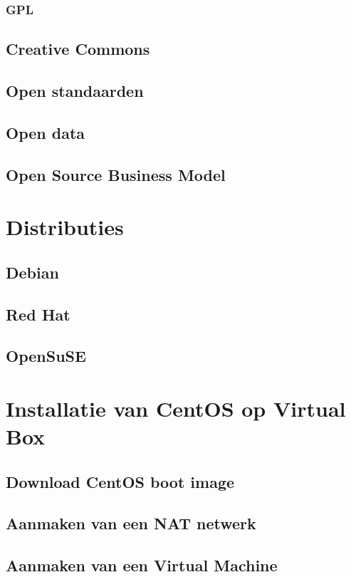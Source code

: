\documentclass[a4paper,12pt,twoside,openright,titlepage]{book}
\begin{document}
\subsection{GPL}

\section{Creative Commons}

\section{Open standaarden}

\section{Open data}

\section{Open Source Business Model}


\chapter{Distributies}

\section{Debian}

\section{Red Hat}

\section{OpenSuSE}


\chapter{Installatie van CentOS op Virtual Box}
\section{Download CentOS boot image}

\section{Aanmaken van een NAT netwerk}

\section{Aanmaken van een Virtual Machine}

\end{document}
